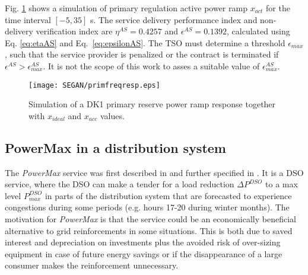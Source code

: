 Fig. \ref{fig:DK1PrimResSim} shows a simulation of primary regulation active power ramp $x_{act}$ for the time interval $[-5,35]$ s. The service delivery performance index and non-delivery verification index are $\eta^{AS}=0.4257$ and $\epsilon^{AS}=0.1392$, calculated using Eq. \eqref{eq:etaAS} and Eq.~\eqref{eq:epsilonAS}. The TSO must determine a threshold $\epsilon_{max}$, such that the service provider is penalized or the contract is terminated if $\epsilon^{AS}>\epsilon^{AS}_{max}$. It is not the scope of this work to asses a suitable value of $\epsilon^{AS}_{max}$.%

\begin{figure}
\centering
\texttt{[image: SEGAN/primfreqresp.eps]}
\caption{Simulation of a DK1 primary reserve power ramp response together with $x_{ideal}$ and $x_{acc}$ values.}
\label{fig:DK1PrimResSim}
\end{figure}

\subsection{PowerMax in a distribution system}
The \textit{PowerMax} service was first described in \cite{ding2013development} and further specified in \cite{bondy2014powermax}. It is a DSO service, where the DSO can make a tender for a load reduction $\Delta P^{DSO}$ to a max level $P_{max}^{DSO}$ in parts of the distribution system that are forecasted to experience congestions during some periods (e.g. hours 17-20 during winter months). The motivation for \textit{PowerMax} is that the service could be an economically beneficial alternative to grid reinforcements in some situations. This is both due to saved interest and depreciation on investments plus the avoided risk of over-sizing equipment in case of future energy savings or if the disappearance of a large consumer makes the reinforcement unnecessary.%

